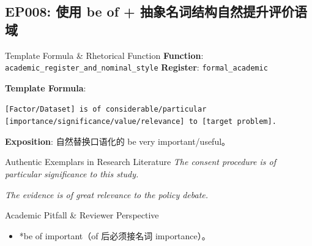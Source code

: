 \subsection{EP008: 使用 be of + 抽象名词结构自然提升评价语域}\label{sec:ep:EP008}
\begin{ConceptBox}{Template Formula \& Rhetorical Function}
\textbf{Function}: \texttt{academic\_register\_and\_nominal\_style} \quad \textbf{Register}: \texttt{formal\_academic}\par\vspace{3pt}
\textbf{Template Formula}:\par\noindent\texttt{[Factor/Dataset] is of considerable/particular [importance/significance/value/relevance] to [target problem].}\par\vspace{4pt}
\textbf{Exposition}: 自然替换口语化的 be very important/useful。
\end{ConceptBox}
\begin{ExampleBox}{Authentic Exemplars in Research Literature}
\textit{The consent procedure is of particular significance to this study.}\par\vspace{2pt}
\textit{The evidence is of great relevance to the policy debate.}\par\vspace{2pt}
\end{ExampleBox}
\begin{TipBox}{Academic Pitfall \& Reviewer Perspective}
\begin{itemize}[leftmargin=1.5em, itemsep=1pt]
  \item *be of important（of 后必须接名词 importance）。
\end{itemize}
\end{TipBox}
\vspace{6pt}
